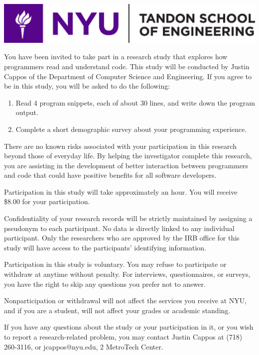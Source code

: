 \documentclass[12pt, a4paper, oneside]{article}
\begin{document}
\thispagestyle{empty}

\includegraphics[width=0.5\paperwidth]{images/tandon_long_color.png}

\vspace{20pt}

You have been invited to take part in a research study that explores
how programmers read and understand code. This study will be conducted
by Justin Cappos of the Department of Computer Science and Engineering.
If you agree to be in this study, you will be asked to do the
following:

\begin{enumerate}
\item
  {Read 4 program snippets, each of about 30 lines, and write down the
  program output.}
\item
  {Complete a short demographic survey about your programming
  experience.}
\end{enumerate}

There are no known risks associated with your participation in this
research beyond those of everyday life. By helping the investigator
complete this research, you are assisting in the development of better
interaction between programmers and code that could have positive
benefits for all software developers.

Participation in this study will take approximately an hour. You
will receive \$8.00 for your participation.

Confidentiality of your research records will be strictly maintained by
assigning a pseudonym to each participant. No data is directly linked to
any individual participant. Only the researchers who are approved by the
IRB office for this study will have access to the participants'
identifying information.

Participation in this study is voluntary. You may refuse to participate
or withdraw at anytime without penalty. For interviews, questionnaires,
or surveys, you have the right to skip any questions you prefer not to
answer.

Nonparticipation or withdrawal will not affect the services you receive
at NYU, and if you are a student, will not affect your grades or
academic standing.

If you have any questions about the study or your participation in it,
or you wish to report a research-related problem, you may contact Justin
Cappos at (718) 260-3116, or jcappos@nyu.edu, 2 MetroTech Center.
\end{document}
